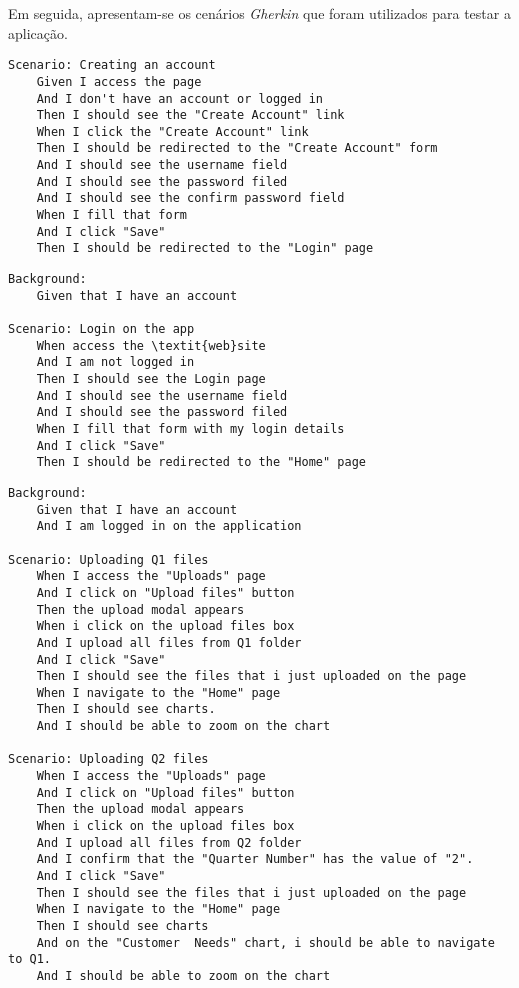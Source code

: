 Em seguida, apresentam-se os cenários \textit{Gherkin} que foram utilizados para testar a aplicação.

\begin{lstlisting}[language=Gherkin]
Scenario: Creating an account
    Given I access the page 
    And I don't have an account or logged in
    Then I should see the "Create Account" link
    When I click the "Create Account" link
    Then I should be redirected to the "Create Account" form
    And I should see the username field
    And I should see the password filed
    And I should see the confirm password field
    When I fill that form
    And I click "Save"
    Then I should be redirected to the "Login" page
\end{lstlisting}



\begin{lstlisting}[language=Gherkin]
Background:
	Given that I have an account

Scenario: Login on the app
	When access the \textit{web}site
	And I am not logged in
	Then I should see the Login page
	And I should see the username field
	And I should see the password filed
	When I fill that form with my login details
	And I click "Save"
	Then I should be redirected to the "Home" page
\end{lstlisting}
    
\begin{lstlisting}[language=Gherkin]
Background:
	Given that I have an account
	And I am logged in on the application

Scenario: Uploading Q1 files
	When I access the "Uploads" page  
	And I click on "Upload files" button 
	Then the upload modal appears 
	When i click on the upload files box
	And I upload all files from Q1 folder
	And I click "Save"
	Then I should see the files that i just uploaded on the page
	When I navigate to the "Home" page
	Then I should see charts. 
	And I should be able to zoom on the chart
	
Scenario: Uploading Q2 files
	When I access the "Uploads" page  
	And I click on "Upload files" button 
	Then the upload modal appears 
	When i click on the upload files box
	And I upload all files from Q2 folder
	And I confirm that the "Quarter Number" has the value of "2".
	And I click "Save"
	Then I should see the files that i just uploaded on the page
	When I navigate to the "Home" page
	Then I should see charts
	And on the "Customer  Needs" chart, i should be able to navigate to Q1.
	And I should be able to zoom on the chart
\end{lstlisting}

